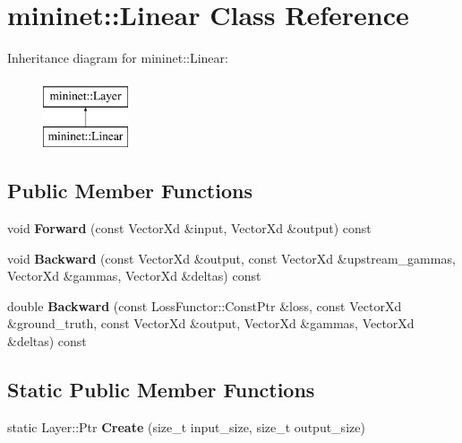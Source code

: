 \hypertarget{classmininet_1_1_linear}{}\section{mininet\+:\+:Linear Class Reference}
\label{classmininet_1_1_linear}
Inheritance diagram for mininet\+:\+:Linear\+:\begin{figure}[H]
\begin{center}
\leavevmode
\includegraphics[height=2.000000cm]{classmininet_1_1_linear}
\end{center}
\end{figure}
\subsection*{Public Member Functions}
\begin{DoxyCompactItemize}
\item 
\hypertarget{classmininet_1_1_linear_a8eeee124abcf67cfc6a8d7f454614176}{}\label{classmininet_1_1_linear_a8eeee124abcf67cfc6a8d7f454614176} 
void {\bfseries Forward} (const Vector\+Xd \&input, Vector\+Xd \&output) const
\item 
\hypertarget{classmininet_1_1_linear_a4110f49a58f2b47c6d61ec668ae23a16}{}\label{classmininet_1_1_linear_a4110f49a58f2b47c6d61ec668ae23a16} 
void {\bfseries Backward} (const Vector\+Xd \&output, const Vector\+Xd \&upstream\+\_\+gammas, Vector\+Xd \&gammas, Vector\+Xd \&deltas) const
\item 
\hypertarget{classmininet_1_1_linear_a7ba24a5144d92046c13e2f86b6c795c0}{}\label{classmininet_1_1_linear_a7ba24a5144d92046c13e2f86b6c795c0} 
double {\bfseries Backward} (const Loss\+Functor\+::\+Const\+Ptr \&loss, const Vector\+Xd \&ground\+\_\+truth, const Vector\+Xd \&output, Vector\+Xd \&gammas, Vector\+Xd \&deltas) const
\end{DoxyCompactItemize}
\subsection*{Static Public Member Functions}
\begin{DoxyCompactItemize}
\item 
\hypertarget{classmininet_1_1_linear_a7e25470f6e2aca4e5f162d8ab1ba5e02}{}\label{classmininet_1_1_linear_a7e25470f6e2aca4e5f162d8ab1ba5e02} 
static Layer\+::\+Ptr {\bfseries Create} (size\+\_\+t input\+\_\+size, size\+\_\+t output\+\_\+size)
\end{DoxyCompactItemize}
